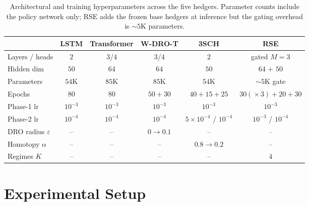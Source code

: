 \documentclass[10pt,letterpaper]{article}
\begin{document}
\begin{table}[ht]
\centering\small
\caption{Architectural and training hyperparameters across the five
hedgers. Parameter counts include the policy network only; RSE adds
the frozen base hedgers at inference but the gating overhead is
$\sim 5$K parameters.}
\label{tab:hyper}
\begin{tabular}{@{}lccccc@{}}
\toprule
& \textbf{LSTM} & \textbf{Transformer} & \textbf{W-DRO-T} & \textbf{3SCH} & \textbf{RSE} \\\midrule
Layers / heads          & $2$       & $3$/$4$     & $3$/$4$     & $2$       & gated $M=3$ \\
Hidden dim              & $50$      & $64$        & $64$        & $50$      & $64$ + $50$ \\
Parameters              & $54$K     & $85$K       & $85$K       & $54$K     & $\sim 5$K gate \\
Epochs                  & $80$      & $80$        & $50+30$     & $40+15+25$& $30(\!\times3)+20+30$ \\
Phase-1 lr              & $10^{-3}$ & $10^{-3}$   & $10^{-3}$   & $10^{-3}$ & $10^{-3}$ \\
Phase-2 lr              & $10^{-4}$ & $10^{-4}$   & $10^{-4}$   & $5\!\times\!10^{-4}$ / $10^{-4}$ & $10^{-3}$ / $10^{-4}$ \\
DRO radius $\varepsilon$ & --       & --          & $0\to 0.1$ & --        & -- \\
Homotopy $\alpha$       & --        & --          & --          & $0.8\to 0.2$ & -- \\
Regimes $K$             & --        & --          & --          & --        & $4$ \\
\bottomrule
\end{tabular}
\end{table}

\section{Experimental Setup}\label{sec:experiments}
\end{document}
